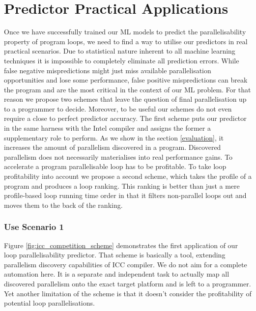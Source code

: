 \documentclass[sigconf,10pt,review,anonymous]{acmart}
\begin{document}
\section{Predictor Practical Applications}
\label{practical_applications}
\quad Once we have successfully trained our ML models to predict the parallelisability property of program loops, we need to find a way to utilise our predictors in real practical scenarios. Due to statistical nature inherent to all machine learning techniques it is impossible to completely eliminate all prediction errors. While false negative mispredictions might just miss available parallelisation opportunities and lose some performance, false positive mispredictions can break the program and are the most critical in the context of our ML problem.\newline\null
\quad For that reason we propose two schemes that leave the question of final parallelisation up to a programmer to decide. Moreover, to be useful our schemes do not even require a close to perfect predictor accuracy. The first scheme puts our predictor in the same harness with the Intel compiler and assigns the former a supplementary role to perform. As we show in the section \ref{evaluation}, it increases the amount of parallelism discovered in a program. Discovered parallelism does not necessarily materialises into real performance gains. To accelerate a program parallelisable loop has to be profitable. To take loop profitability into account we propose a second scheme, which takes the profile of a program and produces a loop ranking. This ranking is better than just a mere profile-based loop running time order in that it filters non-parallel loops out and moves them to the back of the ranking.

\subsubsection{Use Scenario 1}
\label{application_icc_competition}
\quad Figure \ref{fig:icc_competition_scheme} demonstrates the first application of our loop parallelisability predictor. That scheme is basically a tool, extending parallelism discovery capabilities of ICC compiler. We do not aim for a complete automation here. It is a separate and independent task to actually map all discovered parallelism onto the exact target platform and is left to a programmer. Yet another limitation of the scheme is that it doesn't consider the profitability of potential loop parallelisations.
\end{document}
